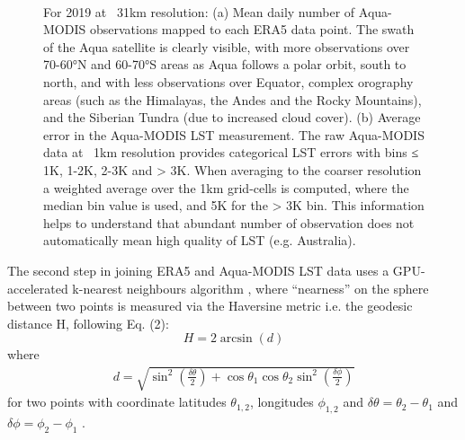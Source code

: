 \documentclass[hess, twostagejnl]{copernicus}
\begin{document}
\begin{figure}
	 \\
	\caption{For 2019 at ~31km resolution: (a) Mean daily number of Aqua-MODIS observations mapped to each ERA5 data point. The swath of the Aqua satellite is clearly visible, with more observations over 70-60°N and 60-70°S areas as Aqua follows a polar orbit, south to north, and with less observations over Equator, complex orography areas (such as the Himalayas, the Andes and the Rocky Mountains), and the Siberian Tundra (due to increased cloud cover). (b) Average error in the Aqua-MODIS LST measurement. The raw Aqua-MODIS data at ~1km resolution provides categorical LST errors with bins ≤ 1K, 1-2K, 2-3K and > 3K. When averaging to the coarser resolution a weighted average over the 1km grid-cells is computed, where the median bin value is used, and 5K for the > 3K bin. This information helps to understand that abundant number of observation does not automatically mean high quality of LST (e.g. Australia).} 
	\label{fig:MODIS_time_error_N}
\end{figure}
\noindent The second step in joining ERA5 and Aqua-MODIS LST data uses a GPU-accelerated k-nearest neighbours algorithm \cite{Rapids}, where “nearness” on the sphere between two points is measured via the Haversine metric i.e. the geodesic distance H, following Eq. (2):
\begin{equation}
	H = 2 \arcsin (d)
\end{equation}
where
\begin{eqnarray}
	d = \sqrt{\sin^2\left(\frac{\delta\theta}{2}\right) + \cos \theta_1 \cos \theta_2 \sin^2\left(\frac{\delta \phi}{2}\right) }
\end{eqnarray} 
for two points with coordinate latitudes $\theta_{1,2}$, longitudes $\phi_{1,2}$ and $\delta \theta = \theta_2 - \theta_1$ and  $\delta \phi = \phi_2 - \phi_1$ . 
\end{document}
